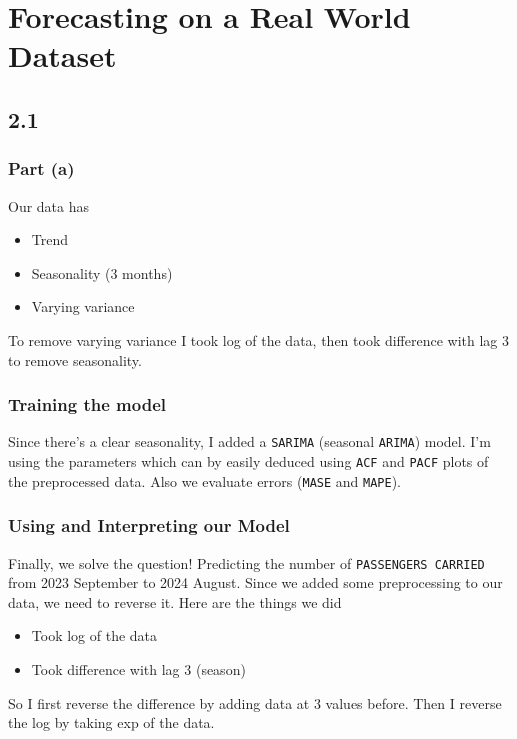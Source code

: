 \section{Forecasting on a Real World Dataset}
\subsection{2.1}
\subsubsection{Part (a)}
Our data has
\begin{itemize}[nosep]
	\item Trend
	\item Seasonality (3 months)
	\item Varying variance
\end{itemize}

To remove varying variance I took log of the data, then took difference with
lag 3 to remove seasonality.
\subsubsection{Training the model}
Since there's a clear seasonality, I added a \texttt{SARIMA} (seasonal \texttt{ARIMA}) model.
I'm using the parameters which can by easily deduced using \texttt{ACF} and \texttt{PACF} plots
of the preprocessed data. Also we evaluate errors (\texttt{MASE} and \texttt{MAPE}).
\subsubsection{Using and Interpreting our Model}
Finally, we solve the question! Predicting the number of \texttt{PASSENGERS CARRIED}
from 2023 September to 2024 August. Since we added some preprocessing to our
data, we need to reverse it. Here are the things we did
\begin{itemize}[nosep]
	\item Took log of the data
	\item Took difference with lag 3 (season)
\end{itemize}

So I first reverse the difference by adding data at 3 values before. Then I
reverse the log by taking exp of the data.


